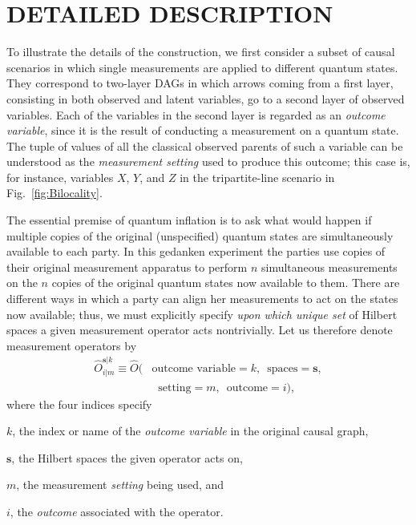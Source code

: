 \documentclass[superscriptaddress,aps,prx,nofootinbib,twocolumn,twoside,reprint,letterpaper,longbibliography]{revtex4-2}
\newcommand{\term}[1]{\textcolor{medblue}{\textbf{#1}}}
\begin{document}
\section{DETAILED DESCRIPTION}\label{sec:details}
To illustrate the details of the construction, we first consider a subset of causal scenarios in which single measurements are applied to different quantum states. They correspond to two-layer DAGs in which arrows coming from a first layer, consisting in both observed and latent variables, go to a second layer of observed variables. Each of the variables in the second layer is regarded as an \emph{outcome variable}, since it is the result of conducting a measurement on a quantum state. The tuple of values of all the classical observed parents of such a variable can be understood as the \emph{measurement setting} used to produce this outcome; this case is, for instance, variables $X$, $Y$, and $Z$ in the tripartite-line scenario in Fig.~\ref{fig:Bilocality}.

The essential premise of quantum inflation is to ask what would happen if multiple copies of the original (unspecified) quantum states are simultaneously available to each party.
In this gedanken experiment the parties use copies of their original measurement apparatus to perform $n$ simultaneous measurements on the $n$ copies of the original quantum states now available to them.
There are different ways in which a party can align her measurements to act on the states now available; thus, we must explicitly specify \emph{upon which unique set} of Hilbert spaces a given measurement operator acts nontrivially.
Let us therefore denote measurement operators by
\begin{align*}
\hat{O}^{\boldsymbol{s}|k}_{i|m}\equiv\hat{O}\big(&\text{outcome variable}{=}k,\,\text{ spaces}{=}\boldsymbol{s},\\
&\;\;\text{setting}{=}m,\,\text{ outcome}{=}i\big),
\end{align*}
where the four indices specify
\begin{compactenum}
\item \term{$k$}, the index or name of the \emph{outcome variable} in the original causal graph,
\item \term{$\boldsymbol{s}$}, the Hilbert spaces the given operator acts on,%
\item \term{$m$}, the measurement \emph{setting} being used, and
\item \term{$i$}, the \emph{outcome} associated with the operator.
\end{compactenum}
\end{document}

